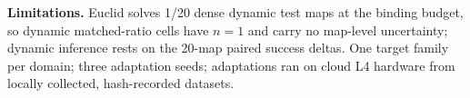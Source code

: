 \documentclass[letterpaper]{article} %
\begin{document}
\textbf{Limitations.} Euclid solves 1/20 dense dynamic test maps at the binding budget, so dynamic matched-ratio cells have $n{=}1$ and carry no map-level uncertainty; dynamic inference rests on the 20-map paired success deltas. One target family per domain; three adaptation seeds; adaptations ran on cloud L4 hardware from locally collected, hash-recorded datasets.
\end{document}
